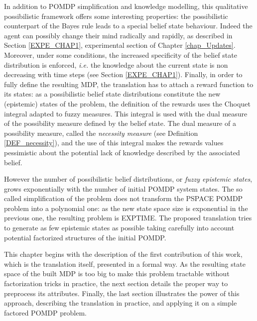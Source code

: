 In addition to POMDP simplification and knowledge modelling, this qualitative
possibilistic framework offers some interesting properties: the possibilistic counterpart 
of the Bayes rule leads to a special belief state behaviour. Indeed the 
agent can possibly change their mind radically and rapidly, 
as described in Section \ref{EXPE_CHAP1}, 
experimental section of Chapter \ref{chap_Updates}.%
Moreover, under some conditions, the increased specificity of the belief state distribution is enforced, \textit{i.e.} 
the knowledge about the current state is non decreasing with time steps (see Section \ref{EXPE_CHAP1}).
Finally, in order to fully define the resulting MDP, the translation has to attach 
a reward function to its states: as a possibilistic belief state distributions 
constitute the new (epistemic) states of the problem, the definition of the rewards
uses the Choquet integral adapted to fuzzy measures. 
This integral is used with the dual measure of the possibility measure defined by the belief state. 
The dual measure of a possibility measure, called the \textit{necessity measure} (see Definition \ref{DEF_necessity}), 
and the use of this integral makes the rewards values pessimistic about the potential lack of knowledge
described by the associated belief.

However the number of possibilistic belief distributions, or \textit{fuzzy epistemic states},
grows exponentially with the number of initial POMDP system states. 
The so called simplification of the problem does not transform the PSPACE POMDP 
problem into a polynomial one: as the new state space size is exponential in the 
previous one, the resulting problem is EXPTIME. The proposed translation 
tries to generate as few epistemic states as possible taking carefully into account
potential factorized structures of the initial POMDP.

This chapter begins with the description of 
the first contribution of this work, which is the translation itself, 
presented in a formal way.
As the resulting state space of the built MDP is too big to make this problem
tractable without factorization tricks in practice,
the next section details the proper way to preprocess its attributes.
Finally, the last section illustrates the power of this approach,
describing the translation in practice, 
and applying it on a simple factored POMDP problem.

